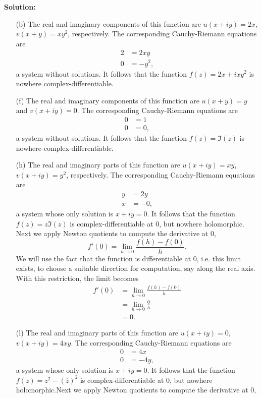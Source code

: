 \documentclass[12pt,oneside]{exam}
\begin{document}
\noindent \textbf{Solution:}
\begin{itemize}
\item[(b)] The real and imaginary components of this function are $u(x+iy)=2x$, $v(x+y)=xy^2$, respectively. The corresponding Cauchy-Riemann equations are
\begin{align*}
2 & = 2xy \\
0 & = -y^2,
\end{align*}
a system without solutions. It follows that the function $f(z)=2x+ixy^2$ is nowhere complex-differentiable. 
\item[(f)] The real and imaginary components of this function are $u(x+y) = y$ and $v(x+iy)=0$. The corresponding Cauchy-Riemann equations are 
\begin{align*}
0 & = 1 \\
0 & = 0,
\end{align*}
a system without solutions. It follows that the function $f(z) = \Im(z)$ is nowhere-complex-differentiable.
\item[(h)] The real and imaginary parts of this function are $u(x+iy)=xy$, $v(x+iy) = y^2$, respectively. The corresponding Cauchy-Riemann equations are 
\begin{align*}
y & = 2y \\
x & = -0,
\end{align*}
a system whose only solution is $x+iy=0$. It follows that the function $f(z)=z\Im(z)$ is complex-differentiable at $0$, but nowhere holomorphic. Next we apply Newton quotients to compute the derivative at $0$, 
\begin{equation*}
f'(0) = \lim_{h \to 0} \frac{f(h)-f(0)}{h}.
\end{equation*}
We will use the fact that the function is differentiable at $0$, i.e. this limit exists, to choose a suitable direction for computation, say along the real axis. With this restriction, the limit becomes
\begin{align*}
f'(0) & = \lim_{h \to 0} \frac{f(h)-f(0)}{h}\\
& = \lim_{h \to 0} \frac{0}{h}\\
& = 0.
\end{align*} 
\item[(l)] The real and imaginary parts of this function are $u(x+iy)=0$, $v(x+iy)=4xy$. The corresponding Cauchy-Riemann equations are 
\begin{align*}
0 & = 4x \\
0 & =-4y,
\end{align*}
a system whose only solution is $x+iy=0$. It follows that the function $f(z)=z^2-(\overline{z})^2$ is complex-differentiable at $0$, but nowhere holomorphic.Next we apply Newton quotients to compute the derivative at $0$, 

\end{itemize}
\end{document}
